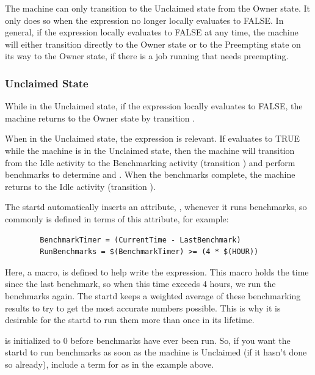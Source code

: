 The machine can only transition to the Unclaimed state from the Owner state.
It only does so when the  expression no longer locally
evaluates to FALSE.
In general, if the 
expression locally evaluates to FALSE at any time,
the machine will either transition directly to the Owner state
or to the Preempting state on its way to the Owner state,
if there is a job running that needs preempting.

\subsubsection{\label{sec:Unclaimed-State}Unclaimed State}

While in the Unclaimed state, if the  expression locally
evaluates to FALSE, the machine returns to the Owner state by
transition .

When in the Unclaimed state,
the  \label{param:RunBenchmarks}  
expression is relevant.
If  evaluates to TRUE while the machine
is in the Unclaimed state,
then the machine will transition from the Idle
activity to the Benchmarking activity (transition ) and
perform benchmarks to determine  and .  
When the benchmarks complete, the machine returns to the Idle activity
(transition ).

The startd automatically inserts an attribute, ,
whenever it runs benchmarks, so commonly  is
defined in terms of this attribute, for example:
\begin{verbatim}
        BenchmarkTimer = (CurrentTime - LastBenchmark)
        RunBenchmarks = $(BenchmarkTimer) >= (4 * $(HOUR))
\end{verbatim}
Here, a macro,  is defined to help write the
expression.
This macro holds the time since the last benchmark,
so when this time exceeds 4 hours, we run the benchmarks again.
The startd keeps a weighted average of these benchmarking
results to try to get the most accurate numbers possible.
This is why
it is desirable for 
the startd to run them more than once in its lifetime.

\Note {} is initialized to 0 before benchmarks
have ever been run.
So, if you want the startd to run benchmarks as soon as the machine is
Unclaimed (if it hasn't done so already),
include a term for  as in the example above.

